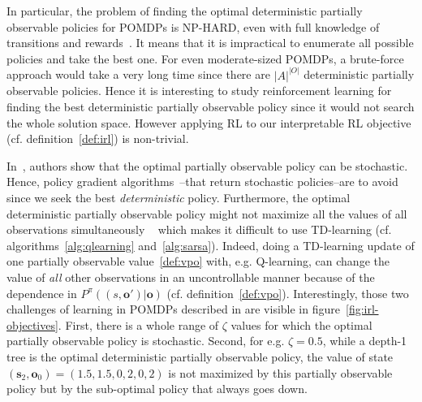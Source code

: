 In particular, the problem of finding the optimal deterministic partially observable policies for POMDPs is NP-HARD, even with full knowledge of transitions and rewards~\cite[section 3.2]{littman1}.
It means that it is impractical to enumerate all possible policies and take the best one. 
For even moderate-sized POMDPs, a brute-force approach would take a very long time since there are $|A|^{|O|}$ deterministic partially observable policies.
Hence it is interesting to study reinforcement learning for finding the best deterministic partially observable policy since it would not search the whole solution space.
However applying RL to our interpretable RL objective (cf. definition~\ref{def:irl}) is non-trivial.

In~\cite[Fact 2]{learning-pomdp}, authors show that the optimal partially observable policy can be stochastic. Hence, policy gradient algorithms~\cite{pg_sutton}--that return stochastic policies--are to avoid since we seek the best \textit{deterministic} policy. 
Furthermore, the optimal deterministic partially observable policy might not maximize all the values of all observations simultaneously ~\cite[Fact 5]{learning-pomdp} which makes it difficult to use TD-learning (cf. algorithms~\ref{alg:qlearning} and~\ref{alg:sarsa}).
Indeed, doing a TD-learning update of one partially observable value~\ref{def:vpo} with, e.g. Q-learning, can change the value of \textit{all} other observations in an uncontrollable manner because of the dependence in $P^{\pi}((s, \boldsymbol{o}')|\boldsymbol{o})$ (cf. definition~\ref{def:vpo}).
Interestingly, those two challenges of learning in POMDPs described in \cite{learning-pomdp} are visible in figure~\ref{fig:irl-objectives}. 
First, there is a whole range of $\zeta$ values for which the optimal partially observable policy is stochastic.
Second, for e.g. $\zeta=0.5$, while a depth-1 tree is the optimal deterministic partially observable policy, the value of state $(\boldsymbol{s}_2, \boldsymbol{o}_0) = (1.5, 1.5, 0, 2, 0, 2)$ is not maximized by this partially observable policy but by the sub-optimal policy that always goes down.

